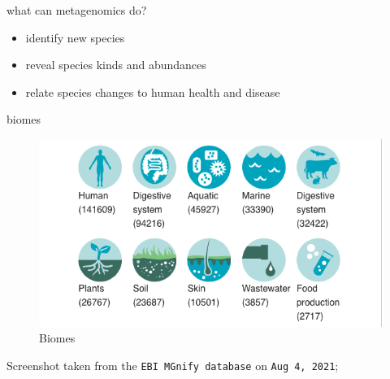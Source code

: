 \documentclass[ignorenonframetext,]{beamer}
\providecommand{\tightlist}{%
  \setlength{\itemsep}{0pt}\setlength{\parskip}{0pt}}
\begin{document}
\begin{frame}{what can metagenomics do?}
\protect\hypertarget{what-can-metagenomics-do}{}
\begin{itemize}
\tightlist
\item
  identify new species
\item
  reveal species kinds and abundances
\item
  relate species changes to human health and disease
\end{itemize}
\end{frame}

\begin{frame}[fragile]{biomes}
\protect\hypertarget{biomes}{}
\begin{figure}
\centering
\includegraphics[width=\textwidth,height=0.6\textheight]{images/talk06/ebi_metagenomics_biomes_aug4_2021.png}
\caption{Biomes}
\end{figure}

Screenshot taken from the \texttt{EBI\ MGnify\ database} on
\texttt{Aug\ 4,\ 2021};
\end{frame}
\end{document}
